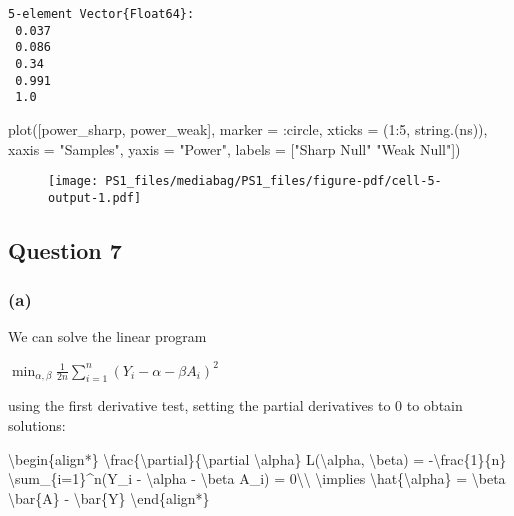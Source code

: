 \documentclass[
  11pt,
  letterpaper,
  DIV=11,
  numbers=noendperiod]{scrartcl}
\newenvironment{Shaded}{}{}
\newcommand{\FloatTok}[1]{\textcolor[rgb]{0.96,0.45,0.00}{#1}}
\newcommand{\FunctionTok}[1]{\textcolor[rgb]{0.41,0.62,0.42}{#1}}
\newcommand{\NormalTok}[1]{\textcolor[rgb]{0.24,0.22,0.21}{#1}}
\newcommand{\OperatorTok}[1]{\textcolor[rgb]{0.24,0.22,0.21}{#1}}
\newcommand{\StringTok}[1]{\textcolor[rgb]{0.60,0.59,0.10}{#1}}
\begin{document}
\begin{verbatim}
5-element Vector{Float64}:
 0.037
 0.086
 0.34
 0.991
 1.0
\end{verbatim}

\begin{Shaded}
\begin{Highlighting}[]
\FunctionTok{plot}\NormalTok{([power\_sharp, power\_weak], }
\NormalTok{          marker }\OperatorTok{=} \OperatorTok{:}\NormalTok{circle,}
\NormalTok{          xticks }\OperatorTok{=}\NormalTok{ (}\FloatTok{1}\OperatorTok{:}\FloatTok{5}\NormalTok{, }\FunctionTok{string}\NormalTok{.(ns)),}
\NormalTok{          xaxis }\OperatorTok{=} \StringTok{"Samples"}\NormalTok{, }
\NormalTok{          yaxis }\OperatorTok{=} \StringTok{"Power"}\NormalTok{,}
\NormalTok{          labels }\OperatorTok{=}\NormalTok{ [}\StringTok{"Sharp Null"} \StringTok{"Weak Null"}\NormalTok{])}
\end{Highlighting}
\end{Shaded}

\begin{figure}[H]

{\centering \texttt{[image: PS1\_files/mediabag/PS1\_files/figure-pdf/cell-5-output-1.pdf]}

}

\end{figure}

\newpage{}

\hypertarget{question-7}{%
\subsection{Question 7}\label{question-7}}

\hypertarget{a-2}{%
\subsubsection{(a)}\label{a-2}}

We can solve the linear program

\(\min_{\alpha,\beta} \frac{1}{2n} \sum_{i=1}^n(Y_i - \alpha - \beta A_i)^2\)

using the first derivative test, setting the partial derivatives to 0 to
obtain solutions:

\begin{Shaded}
\begin{Highlighting}[]
\NormalTok{\textbackslash{}begin\{align*\}}
\NormalTok{  \textbackslash{}frac\{\textbackslash{}partial\}\{\textbackslash{}partial \textbackslash{}alpha\} L(\textbackslash{}alpha, \textbackslash{}beta) = {-}\textbackslash{}frac\{1\}\{n\} \textbackslash{}sum\_\{i=1\}\^{}n(Y\_i {-} \textbackslash{}alpha {-} \textbackslash{}beta A\_i) = 0\textbackslash{}\textbackslash{}}
\NormalTok{  \textbackslash{}implies \textbackslash{}hat\{\textbackslash{}alpha\} =  \textbackslash{}beta \textbackslash{}bar\{A\} {-} \textbackslash{}bar\{Y\}}
\NormalTok{\textbackslash{}end\{align*\}}
\end{Highlighting}
\end{Shaded}
\end{document}

